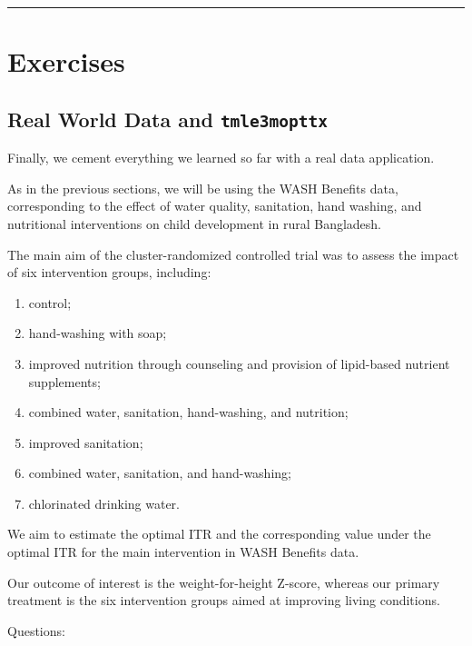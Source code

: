 \documentclass[12pt, krantz2,]{krantz}
\theoremstyle{definition}
\theoremstyle{definition}
\theoremstyle{definition}
\newcommand{\1}{\mathbbm{1}}
\begin{document}
\begin{center}\rule{0.5\linewidth}{0.5pt}\end{center}

\hypertarget{exercises-2}{%
\section{Exercises}\label{exercises-2}}

\hypertarget{real-world-data-and-tmle3mopttx}{%
\subsection{\texorpdfstring{Real World Data and \texttt{tmle3mopttx}}{Real World Data and tmle3mopttx}}\label{real-world-data-and-tmle3mopttx}}

Finally, we cement everything we learned so far with a real data application.

As in the previous sections, we will be using the WASH Benefits data,
corresponding to the effect of water quality, sanitation, hand washing, and
nutritional interventions on child development in rural Bangladesh.

The main aim of the cluster-randomized controlled trial was to assess the
impact of six intervention groups, including:

\begin{enumerate}
\def\labelenumi{\arabic{enumi}.}
\item
  control;
\item
  hand-washing with soap;
\item
  improved nutrition through counseling and provision of lipid-based nutrient
  supplements;
\item
  combined water, sanitation, hand-washing, and nutrition;
\item
  improved sanitation;
\item
  combined water, sanitation, and hand-washing;
\item
  chlorinated drinking water.
\end{enumerate}

We aim to estimate the optimal ITR and the corresponding value under the optimal
ITR for the main intervention in WASH Benefits data.

Our outcome of interest is the weight-for-height Z-score, whereas our primary
treatment is the six intervention groups aimed at improving living conditions.

Questions:
\end{document}
